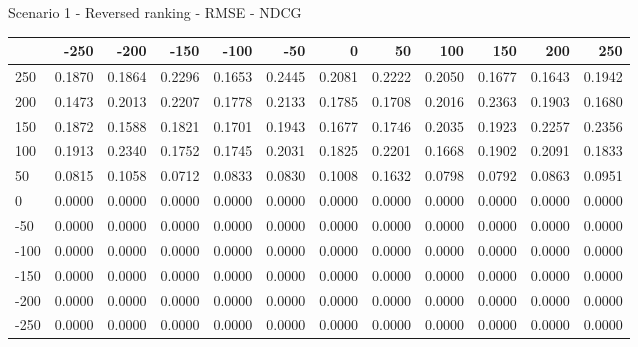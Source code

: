 Scenario 1 - Reversed ranking - RMSE - NDCG
\begin{tabular}{lrrrrrrrrrrr}
\toprule
{} &   -250 &   -200 &   -150 &   -100 &   -50  &    0   &    50  &    100 &    150 &    200 &    250 \\
\midrule
 250 & 0.1870 & 0.1864 & 0.2296 & 0.1653 & 0.2445 & 0.2081 & 0.2222 & 0.2050 & 0.1677 & 0.1643 & 0.1942 \\
 200 & 0.1473 & 0.2013 & 0.2207 & 0.1778 & 0.2133 & 0.1785 & 0.1708 & 0.2016 & 0.2363 & 0.1903 & 0.1680 \\
 150 & 0.1872 & 0.1588 & 0.1821 & 0.1701 & 0.1943 & 0.1677 & 0.1746 & 0.2035 & 0.1923 & 0.2257 & 0.2356 \\
 100 & 0.1913 & 0.2340 & 0.1752 & 0.1745 & 0.2031 & 0.1825 & 0.2201 & 0.1668 & 0.1902 & 0.2091 & 0.1833 \\
 50  & 0.0815 & 0.1058 & 0.0712 & 0.0833 & 0.0830 & 0.1008 & 0.1632 & 0.0798 & 0.0792 & 0.0863 & 0.0951 \\
 0   & 0.0000 & 0.0000 & 0.0000 & 0.0000 & 0.0000 & 0.0000 & 0.0000 & 0.0000 & 0.0000 & 0.0000 & 0.0000 \\
-50  & 0.0000 & 0.0000 & 0.0000 & 0.0000 & 0.0000 & 0.0000 & 0.0000 & 0.0000 & 0.0000 & 0.0000 & 0.0000 \\
-100 & 0.0000 & 0.0000 & 0.0000 & 0.0000 & 0.0000 & 0.0000 & 0.0000 & 0.0000 & 0.0000 & 0.0000 & 0.0000 \\
-150 & 0.0000 & 0.0000 & 0.0000 & 0.0000 & 0.0000 & 0.0000 & 0.0000 & 0.0000 & 0.0000 & 0.0000 & 0.0000 \\
-200 & 0.0000 & 0.0000 & 0.0000 & 0.0000 & 0.0000 & 0.0000 & 0.0000 & 0.0000 & 0.0000 & 0.0000 & 0.0000 \\
-250 & 0.0000 & 0.0000 & 0.0000 & 0.0000 & 0.0000 & 0.0000 & 0.0000 & 0.0000 & 0.0000 & 0.0000 & 0.0000 \\
\bottomrule
\end{tabular}

